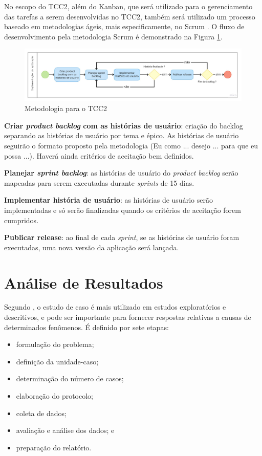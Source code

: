 No escopo do TCC2, além do Kanban, que será utilizado para o gerenciamento das tarefas a serem desenvolvidas no TCC2,
também será utilizado um processo baseado em metodologias ágeis, mais especificamente, no Scrum \cite{scrum2017}. O fluxo de desenvolvimento 
pela metodologia Scrum é demonstrado na Figura \ref{fig05}.


\begin{figure}[h]
	\centering
	\includegraphics[keepaspectratio=true,scale=0.3]{figuras/scrummet.pdf}
	\caption{Metodologia para o TCC2}
        \label{fig05}
\end{figure}

\textbf{Criar \emph{product backlog} com as histórias de usuário}: criação do backlog separando as histórias de usuário por tema e épico. As histórias de usuário seguirão 
o formato proposto pela metodologia (Eu como ... desejo ... para que eu possa ...). Haverá ainda critérios de aceitação bem definidos. 

\textbf{Planejar \emph{sprint backlog}}: as histórias de usuário do \emph{product backlog} serão mapeadas para serem executadas durante \emph{sprints} de 15 dias.

\textbf{Implementar história de usuário}: as histórias de usuário serão implementadas e só serão finalizadas quando os critérios de aceitação forem cumpridos.

\textbf{Publicar release}: ao final de cada \emph{sprint}, se as histórias de usuário foram executadas, uma nova versão da aplicação será lançada. 

\section{Análise de Resultados}

Segundo , o estudo de caso é mais utilizado em estudos exploratórios e descritivos, 
e pode ser importante para fornecer respostas relativas a causas de determinados fenômenos. É definido por sete etapas:
\begin{itemize}
	\item formulação do problema;
	\item definição da unidade-caso;
	\item determinação do número de casos;
	\item elaboração do protocolo;
	\item coleta de dados;
	\item avaliação e análise dos dados; e
	\item preparação do relatório.
\end{itemize}

